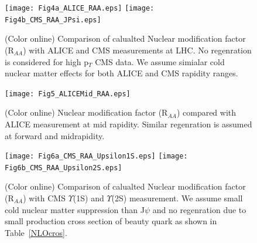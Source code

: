 \documentclass[aps,prc,preprint,superscriptaddress,showpacs,showkeys]{revtex4-1}
\begin{document}
\begin{figure}
\texttt{[image: Fig4a\_ALICE\_RAA.eps]}
\texttt{[image: Fig4b\_CMS\_RAA\_JPsi.eps]}
\caption{(Color online) Comparison of calualted Nuclear modification factor (R$_{AA}$) with ALICE and CMS measurements at LHC. No regenration is 
considered for high p$_{T}$ CMS data. We assume simialar cold nuclear matter effects for both ALICE and CMS rapidity ranges.}
\label{fig:JPsiRaa}
\end{figure}

\begin{figure}
\texttt{[image: Fig5\_ALICEMid\_RAA.eps]}
\caption{(Color online) Nuclear modification factor (R$_{AA}$) compared with ALICE measurement at mid
rapidity. Similar regenration is assumed at forward and midrapidity.}
\label{fig:JPsiRaaALICEMid}
\end{figure}

\begin{figure}
\texttt{[image: Fig6a\_CMS\_RAA\_Upsilon1S.eps]}
\texttt{[image: Fig6b\_CMS\_RAA\_Upsilon2S.eps]}
\caption{(Color online) Comparison of calualted Nuclear modification factor (R$_{AA}$) with CMS $\Upsilon$(1S) and $\Upsilon$(2S) measurement.
We assume small cold nuclear matter suppression than J$\psi$ and no regenration due to small production cross section of beauty quark as shown in Table~\ref{NLOcros}.}
\label{fig:UpsilonRaa}
\end{figure}

 
\end{document}
